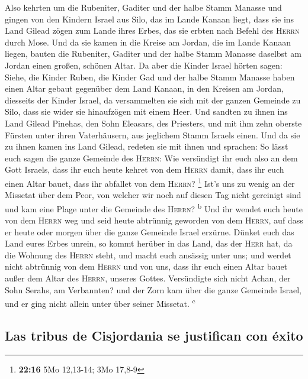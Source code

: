  Also kehrten um die Rubeniter, Gaditer und der halbe
Stamm Manasse und gingen von den Kindern Israel aus Silo, das im Lande
Kanaan liegt, dass sie ins Land Gilead zögen zum Lande ihres Erbes, das
sie erbten nach Befehl des \textsc{Herrn} durch Mose. 
Und da sie kamen in die Kreise am Jordan, die im Lande Kanaan liegen,
bauten die Rubeniter, Gaditer und der halbe Stamm Manasse daselbst am
Jordan einen großen, schönen Altar.  Da aber die Kinder
Israel hörten sagen: Siehe, die Kinder Ruben, die Kinder Gad und der
halbe Stamm Manasse haben einen Altar gebaut gegenüber dem Land Kanaan,
in den Kreisen am Jordan, diesseits der Kinder Israel, 
da versammelten sie sich mit der ganzen Gemeinde zu Silo, dass sie wider
sie hinaufzögen mit einem Heer.  Und sandten zu ihnen ins
Land Gilead Pinehas, den Sohn Eleasars, des Priesters, 
und mit ihm zehn oberste Fürsten unter ihren Vaterhäusern, aus jeglichem
Stamm Israels einen.  Und da sie zu ihnen kamen ins Land
Gilead, redeten sie mit ihnen und sprachen:  So lässt
euch sagen die ganze Gemeinde des \textsc{Herrn}: Wie versündigt ihr
euch also an dem Gott Israels, dass ihr euch heute kehret von dem
\textsc{Herrn} damit, dass ihr euch einen Altar bauet, dass ihr abfallet
von dem \textsc{Herrn}? \footnote{\textbf{22:16} 5Mo 12,13-14; 3Mo
  17,8-9}  Ist's uns zu wenig an der Missetat über dem
Peor, von welcher wir noch auf diesen Tag nicht gereinigt sind und kam
eine Plage unter die Gemeinde des \textsc{Herrn}? \textsuperscript{b}
 Und ihr wendet euch heute von dem \textsc{Herrn} weg und
seid heute abtrünnig geworden von dem \textsc{Herrn}, auf dass er heute
oder morgen über die ganze Gemeinde Israel erzürne. 
Dünket euch das Land eures Erbes unrein, so kommt herüber in das Land,
das der \textsc{Herr} hat, da die Wohnung des \textsc{Herrn} steht, und
macht euch ansässig unter uns; und werdet nicht abtrünnig von dem
\textsc{Herrn} und von uns, dass ihr euch einen Altar bauet außer dem
Altar des \textsc{Herrn}, unseres Gottes.  Versündigte
sich nicht Achan, der Sohn Serahs, am Verbannten? und der Zorn kam über
die ganze Gemeinde Israel, und er ging nicht allein unter über seiner
Missetat. \textsuperscript{c}

\hypertarget{las-tribus-de-cisjordania-se-justifican-con-uxe9xito}{%
\subsection{Las tribus de Cisjordania se justifican con
éxito}\label{las-tribus-de-cisjordania-se-justifican-con-uxe9xito}}

